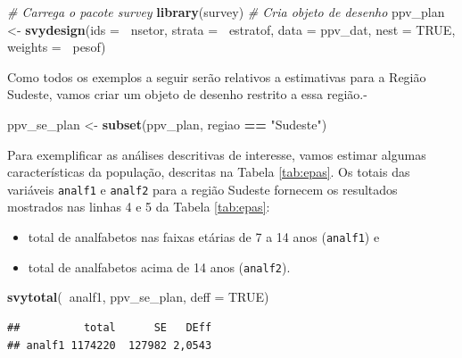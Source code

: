 \documentclass[]{book}
\newenvironment{Shaded}{\begin{snugshade}}{\end{snugshade}}
\newcommand{\KeywordTok}[1]{\textcolor[rgb]{0.13,0.29,0.53}{\textbf{#1}}}
\newcommand{\DataTypeTok}[1]{\textcolor[rgb]{0.13,0.29,0.53}{#1}}
\newcommand{\StringTok}[1]{\textcolor[rgb]{0.31,0.60,0.02}{#1}}
\newcommand{\CommentTok}[1]{\textcolor[rgb]{0.56,0.35,0.01}{\textit{#1}}}
\newcommand{\OtherTok}[1]{\textcolor[rgb]{0.56,0.35,0.01}{#1}}
\newcommand{\OperatorTok}[1]{\textcolor[rgb]{0.81,0.36,0.00}{\textbf{#1}}}
\newcommand{\NormalTok}[1]{#1}
\providecommand{\tightlist}{%
  \setlength{\itemsep}{0pt}\setlength{\parskip}{0pt}}
\theoremstyle{definition}
\theoremstyle{definition}
\theoremstyle{definition}
\theoremstyle{remark}
\begin{document}
\begin{Shaded}
\begin{Highlighting}[]
\CommentTok{# Carrega o pacote survey}
\KeywordTok{library}\NormalTok{(survey)}
\CommentTok{# Cria objeto de desenho}
\NormalTok{ppv_plan <-}\StringTok{ }\KeywordTok{svydesign}\NormalTok{(}\DataTypeTok{ids =} \OperatorTok{~}\NormalTok{nsetor, }\DataTypeTok{strata =} \OperatorTok{~}\NormalTok{estratof, }\DataTypeTok{data =}\NormalTok{ ppv_dat, }
                      \DataTypeTok{nest =} \OtherTok{TRUE}\NormalTok{, }\DataTypeTok{weights =} \OperatorTok{~}\NormalTok{pesof)}
\end{Highlighting}
\end{Shaded}

Como todos os exemplos a seguir serão relativos a estimativas para a
Região Sudeste, vamos criar um objeto de desenho restrito a essa
região.-

\begin{Shaded}
\begin{Highlighting}[]
\NormalTok{ppv_se_plan <-}\StringTok{ }\KeywordTok{subset}\NormalTok{(ppv_plan, regiao }\OperatorTok{==}\StringTok{ "Sudeste"}\NormalTok{)}
\end{Highlighting}
\end{Shaded}

Para exemplificar as análises descritivas de interesse, vamos estimar
algumas características da população, descritas na Tabela
\ref{tab:epas}. Os totais das variáveis \texttt{analf1} e
\texttt{analf2} para a região Sudeste fornecem os resultados mostrados
nas linhas 4 e 5 da Tabela \ref{tab:epas}:

\begin{itemize}
\tightlist
\item
  total de analfabetos nas faixas etárias de 7 a 14 anos
  (\texttt{analf1}) e
\item
  total de analfabetos acima de 14 anos (\texttt{analf2}).
\end{itemize}

\begin{Shaded}
\begin{Highlighting}[]
\KeywordTok{svytotal}\NormalTok{(}\OperatorTok{~}\NormalTok{analf1, ppv_se_plan, }\DataTypeTok{deff =} \OtherTok{TRUE}\NormalTok{)}
\end{Highlighting}
\end{Shaded}

\begin{verbatim}
##          total      SE   DEff
## analf1 1174220  127982 2,0543
\end{verbatim}
\end{document}
